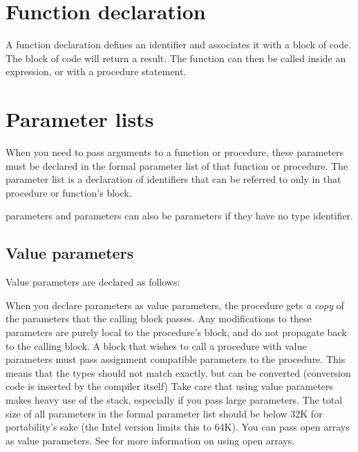 \documentclass{report}
\begin{document}
\section{Function declaration}
A function declaration defines an identifier and associates it with a
block of code. The block of code will return a result.  
The function can then be called inside an expression, or with a procedure 
statement. 

\section{Parameter lists}
\label{se:Parameters}
When you need to pass arguments to a function or procedure, these parameters
must be declared in the formal parameter list of that function or procedure.
The parameter list is a declaration of identifiers that can be referred to 
only in that procedure or function's block.

 parameters and  parameters can also be 
parameters if they have no type identifier.
\subsection{Value parameters}
Value parameters are declared as follows:

When you declare parameters as value parameters, the procedure gets {\em 
a copy} of the parameters that the calling block passes. Any modifications
to these parameters are purely local to the procedure's block, and do not 
propagate back to the calling block.
A block that wishes to call a procedure with value parameters must pass
assignment compatible parameters to the procedure. This means that the types
should not match exactly, but can be converted (conversion code is inserted
by the compiler itself)
Take care that using value parameters makes heavy use of the stack,
especially if you pass large parameters. The total size of all parameters in
the formal parameter list should be below 32K for portability's sake (the
Intel version limits this to 64K).
You can pass open arrays as value parameters. See  for
more information on using open arrays.
\end{document}

